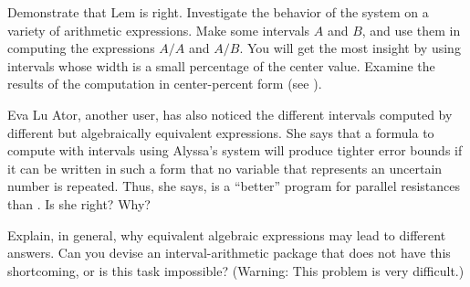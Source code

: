 \begin{exercise}
	\label{Exercise 2.14}
	Demonstrate that Lem is right.
	Investigate the behavior of the system on a variety of arithmetic expressions.
	Make some intervals \( A \) and \( B \), and use them in computing the expressions \( A / A \) and \( A / B \).
	You will get the most insight by using intervals whose width is a small percentage of the center value.
	Examine the results of the computation in center-percent form (see ).
\end{exercise}



\begin{exercise}
	\label{Exercise 2.15}
	Eva Lu Ator, another user, has also noticed the different intervals computed by different but algebraically equivalent expressions.
	She says that a formula to compute with intervals using Alyssa’s system will produce tighter error bounds if it can be written in such a form that no variable that represents an uncertain number is repeated.
	Thus, she says,  is a “better” program for parallel resistances than .
	Is she right?
	Why?
\end{exercise}



\begin{exercise}
	\label{Exercise 2.16}
	Explain, in general, why equivalent algebraic expressions may lead to different answers.
	Can you devise an interval-arithmetic package that does not have this shortcoming, or is this task impossible?
	(Warning:
	This problem is very difficult.)
\end{exercise}
